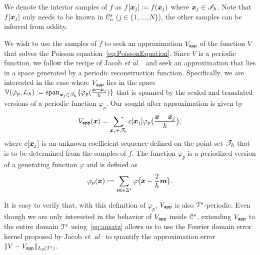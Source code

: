 We denote the interior samples of $f$ as $f[\vect{x}_j] :=
f(\vect{x}_j)$ where $\vect{x}_j \in \pointset{I}_h$. Note that
$f[\vect{x}_j]$ only needs to be known in $\oucube^s$ ($j \in
\{1,\ldots,N\}$), the other samples can be inferred from
oddity. 

We wish to use the samples of $f$ to seek an approximation $\appf{V}$ of the
function $V$ that solves the Poisson equation~\eqref{eq:PoissonEquation}. Since
$V$ is a periodic function, we follow the recipe of Jacob \textit{et
al.}~\cite{jacob02} and seek an approximation that lies in a space generated by
a periodic reconstruction function. Specifically, we are interested in the case
where $\appf{V}$ lies in the space $\aspace{\lattice{L}_h}{\varphi_p} :=
\mathrm{span}_{\vect{x}_j\in\pointset{T}_h}\{
\varphi_p(\frac{\vect{x}-\vect{x}_j}{h}) \}$ that is spanned by the scaled and
translated versions of a periodic function $\varphi_p$. Our sought-after
approximation is given by
\begin{equation}
  \appf{V}(\vect{x}) = \sum_{\vect{x}_j \in \pointset{T}_h} c[\vect{x}_j] 
\varphi_p\bigl(\frac{\vect{x} - \vect{x}_j}{h}\bigr),
\label{eq:ansatz}
\end{equation}
where $c[\vect{x}_j]$ is an unknown coefficient sequence defined on
the point set $\pointset{T}_h$ that is to be determined from the
samples of $f$. The function
$\varphi_p$ is a periodized version of a generating function $\varphi$
and is defined as
\begin{equation}
\varphi_p(\vect{x}) := \sum_{\vect{m} \in \ints^s} 
\varphi\bigl(\vect{x} - \frac{2}{h} \vect{m} \bigr).
\label{eq:periodization}
\end{equation}


It is easy to verify that, with this definition of $\varphi_p$,
$\appf{V}$ is also $\cube^s$-periodic. Even though we are only
interested in the behavior of $\appf{V}$ inside $\ucube^s$, extending
$\appf{V}$ to the entire domain $\cube^s$ using~\eqref{eq:ansatz}
allows us to use the Fourier domain error kernel proposed by Jacob
\textit{et. al}~\cite{jacob02} to quantify the approximation error
$\LLnorm{V - \appf{V}}$.

